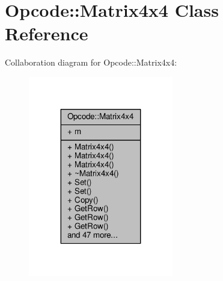 \hypertarget{classOpcode_1_1Matrix4x4}{}\section{Opcode\+:\+:Matrix4x4 Class Reference}
\label{classOpcode_1_1Matrix4x4}


Collaboration diagram for Opcode\+:\+:Matrix4x4\+:
\nopagebreak
\begin{figure}[H]
\begin{center}
\leavevmode
\includegraphics[width=179pt]{d3/d71/classOpcode_1_1Matrix4x4__coll__graph}
\end{center}
\end{figure}
